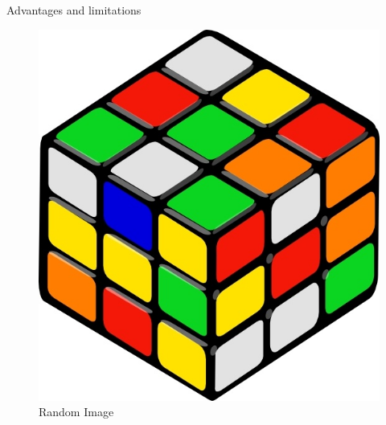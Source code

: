 \begin{section}{Advantages and limitations}
\begin{itemize}
    \end{itemize}
    
    \begin{figure}
    \centering
    \includegraphics[scale=0.2]{images/illustrate/illus1.jpg}
    \caption{Random Image}
    \end{figure}
    
    \end{section}